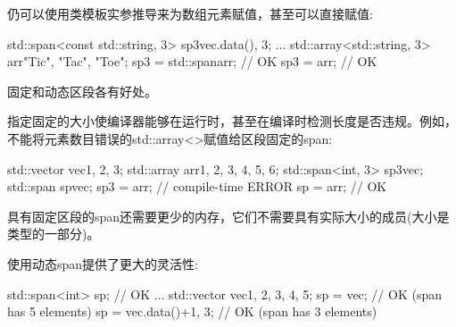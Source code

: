 仍可以使用类模板实参推导来为数组元素赋值，甚至可以直接赋值:

\begin{cpp}
std::span<const std::string, 3> sp3{vec.data(), 3};
...
std::array<std::string, 3> arr{"Tic", "Tac", "Toe"};
sp3 = std::span{arr}; // OK
sp3 = arr; // OK
\end{cpp}


固定和动态区段各有好处。

指定固定的大小使编译器能够在运行时，甚至在编译时检测长度是否违规。例如，不能将元素数目错误的std::array<>赋值给区段固定的span:

\begin{cpp}
std::vector vec{1, 2, 3};
std::array arr{1, 2, 3, 4, 5, 6};
std::span<int, 3> sp3{vec};
std::span sp{vec};
sp3 = arr; // compile-time ERROR
sp = arr; // OK
\end{cpp}

具有固定区段的span还需要更少的内存，它们不需要具有实际大小的成员(大小是类型的一部分)。

使用动态span提供了更大的灵活性:

\begin{cpp}
std::span<int> sp; // OK
...
std::vector vec{1, 2, 3, 4, 5};
sp = vec; // OK (span has 5 elements)
sp = {vec.data()+1, 3}; // OK (span has 3 elements)
\end{cpp}








